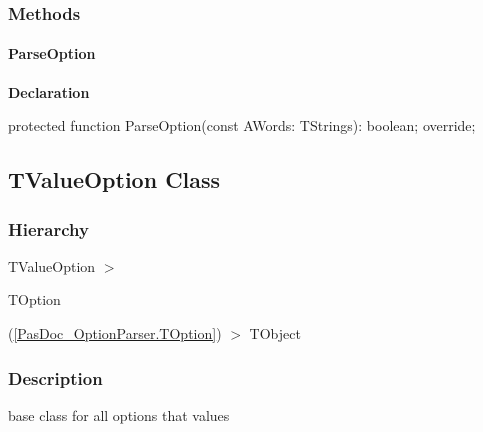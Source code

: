 \documentclass{report}
\newif\ifpdf
\begin{document}
\subsubsection*{\large{\textbf{Methods}}\normalsize\hspace{1ex}\hfill}
\paragraph*{ParseOption}\hspace*{\fill}

\label{PasDoc_OptionParser.TBoolOption-ParseOption}
\begin{list}{}{
\setlength{\itemindent}{0cm}
\setlength{\listparindent}{0cm}
\setlength{\leftmargin}{\evensidemargin}
\addtolength{\leftmargin}{\tmplength}
\settowidth{\labelsep}{X}
\addtolength{\leftmargin}{\labelsep}
\setlength{\labelwidth}{\tmplength}
}
\item[\textbf{Declaration}\hfill]
\ifpdf
\begin{flushleft}
\fi
\begin{ttfamily}
protected function ParseOption(const AWords: TStrings): boolean; override;\end{ttfamily}

\ifpdf
\end{flushleft}
\fi

\end{list}
\ifpdf
\subsection*{\large{\textbf{TValueOption Class}}\normalsize\hspace{1ex}\hrulefill}
\else
\subsection*{TValueOption Class}
\fi
\label{PasDoc_OptionParser.TValueOption}
\subsubsection*{\large{\textbf{Hierarchy}}\normalsize\hspace{1ex}\hfill}
TValueOption {$>$} \begin{ttfamily}TOption\end{ttfamily}(\ref{PasDoc_OptionParser.TOption}) {$>$} 
TObject
\subsubsection*{\large{\textbf{Description}}\normalsize\hspace{1ex}\hfill}
base class for all options that values\hfill\vspace*{1ex}
\end{document}
